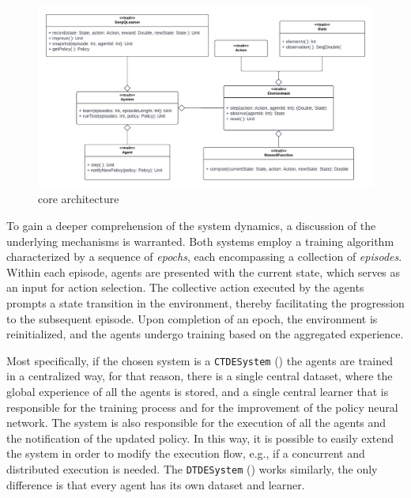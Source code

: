 \begin{figure}[t]
    \centering
    \includegraphics[width=\textwidth]{papers/coordination2023/imgs/core-architecture.pdf}
    \caption{\scarlib{} core architecture}
    \label{coordination2023:fig:arc}
\end{figure} 
To gain a deeper comprehension of the system dynamics, 
 a discussion of the underlying mechanisms is warranted.
%
Both systems employ a training algorithm characterized by a sequence of \emph{epochs}, 
 each encompassing a collection of \emph{episodes}.
Within each episode, 
 agents are presented with the current state, which serves as an input for action selection.
%
The collective action executed by the agents prompts a state transition in the environment, 
 thereby facilitating the progression to the subsequent episode.
Upon completion of an epoch, the environment is reinitialized, 
 and the agents undergo training based on the aggregated experience.

Most specifically,
 if the chosen system is a \texttt{CTDESystem} () the agents are trained in a centralized way, 
 for that reason, there is  a single central dataset, 
 where the global experience of all the agents is stored, 
 and a single central learner that is responsible for the training process 
 and for the improvement of the policy neural network.
% 
The system is also responsible 
 for the execution of all the agents and the notification of the updated policy.
% 
In this way, it is possible to easily extend the system in order to modify the execution flow, e.g., 
 if a concurrent and distributed execution is needed. 
%
The \texttt{DTDESystem} () works similarly, 
 the only difference is that every agent has its own dataset and learner.


